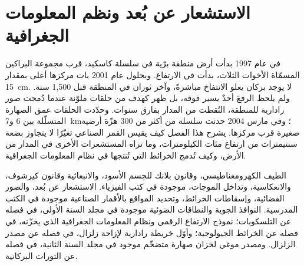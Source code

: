 \chapter{الاستشعار عن بُعد ونظم المعلومات الجغرافية}\label{ch:b3:remote-sensing-gis}

في عام 1997 بدأت أرض منطقة برّية في سلسلة كاسكيد، قرب مجموعة
البراكين المسمّاة الأخوات الثلاث، بدأت في الارتفاع. وبحلول عام 2001 بات مركزها
أعلى بمقدار \qty{15}{cm}. لا يوجد بركان يعلو الانتفاخ مباشرةً، وآخر
ثوران في المنطقة قبل 1,500 سنة. ولم يلحظ الرفعَ
أحدٌ يسير فوقه، بل ظهر كهدف من حلقات ملوّنة عندما
دُمجت صور رادارية للمنطقة، التُقطت من المدار بفارق سنوات.
وحدّدت الحلقات عمق الصهارة المتسلّلة بين 6 و\qty{7}{km}؛ وفي مارس 2004
حدثت سلسلة من أكثر من 300 هزّة أرضية صغيرة قرب مركزها.
يشرح هذا الفصل كيف يقيس القمر الصناعي تغيّرًا لا يتجاوز بضعة
سنتيمترات من ارتفاع مئات الكيلومترات، وما تراه المستشعرات الأخرى في المدار
من الأرض، وكيف تُدمج الخرائط التي تُنتجها في نظام
المعلومات الجغرافية.

\begin{recall}
الطيف الكهرومغناطيسي، وقانون بلانك للجسم الأسود، والانبعاثية
وقانون كيرشوف، والانعكاسية، وتداخل الموجات، موجودة في
كتب الفيزياء. الاستشعار عن بُعد، والصور الفضائية، وإسقاطات الخرائط،
وتحديد المواقع بالأقمار الصناعية موجودة في الكتب المدرسية. النوافذ الجوية
والنطاقات الضوئية موجودة في مجلد السنة الأولى، في فصله عن التلسكوبات؛
نموذج الارتفاع الرقمي ونظام المعلومات الجغرافية الذي
يخزّنه، في فصله عن الخرائط الجيولوجية؛ وأوّل خريطة رادارية
لإزاحة زلزال، في فصله عن مصدر الزلزال. ومصدر موغي
لخزان صهارة متضخّم موجود في مجلد السنة الثانية، في فصله عن
الثورات البركانية.
\end{recall}

